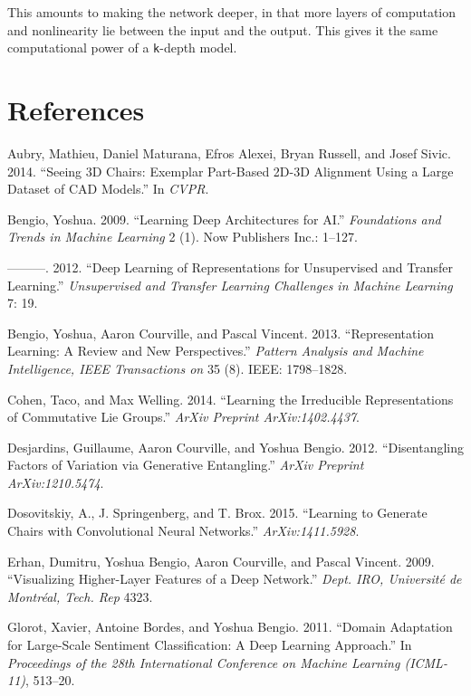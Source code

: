 \documentclass[12pt,twoside]{mitthesis}
\begin{document}
This amounts to making the network deeper, in that more layers of
computation and nonlinearity lie between the input and the output. This
gives it the same computational power of a \texttt{k}-depth model.

\chapter*{References}\label{references}

\hypertarget{refs}{}
\hypertarget{ref-aubry2014seeing}{}
Aubry, Mathieu, Daniel Maturana, Efros Alexei, Bryan Russell, and Josef
Sivic. 2014. ``Seeing 3D Chairs: Exemplar Part-Based 2D-3D Alignment
Using a Large Dataset of CAD Models.'' In \emph{CVPR}.

\hypertarget{ref-bengio2009learning}{}
Bengio, Yoshua. 2009. ``Learning Deep Architectures for AI.''
\emph{Foundations and Trends in Machine Learning} 2 (1). Now Publishers
Inc.: 1--127.

\hypertarget{ref-bengio2012deep}{}
---------. 2012. ``Deep Learning of Representations for Unsupervised and
Transfer Learning.'' \emph{Unsupervised and Transfer Learning Challenges
in Machine Learning} 7: 19.

\hypertarget{ref-bengio2013representation}{}
Bengio, Yoshua, Aaron Courville, and Pascal Vincent. 2013.
``Representation Learning: A Review and New Perspectives.''
\emph{Pattern Analysis and Machine Intelligence, IEEE Transactions on}
35 (8). IEEE: 1798--1828.

\hypertarget{ref-cohen2014learning}{}
Cohen, Taco, and Max Welling. 2014. ``Learning the Irreducible
Representations of Commutative Lie Groups.'' \emph{ArXiv Preprint
ArXiv:1402.4437}.

\hypertarget{ref-desjardins2012disentangling}{}
Desjardins, Guillaume, Aaron Courville, and Yoshua Bengio. 2012.
``Disentangling Factors of Variation via Generative Entangling.''
\emph{ArXiv Preprint ArXiv:1210.5474}.

\hypertarget{ref-dosovitskiy2015learning}{}
Dosovitskiy, A., J. Springenberg, and T. Brox. 2015. ``Learning to
Generate Chairs with Convolutional Neural Networks.''
\emph{ArXiv:1411.5928}.

\hypertarget{ref-erhan2009visualizing}{}
Erhan, Dumitru, Yoshua Bengio, Aaron Courville, and Pascal Vincent.
2009. ``Visualizing Higher-Layer Features of a Deep Network.''
\emph{Dept. IRO, Université de Montréal, Tech. Rep} 4323.

\hypertarget{ref-glorot2011domain}{}
Glorot, Xavier, Antoine Bordes, and Yoshua Bengio. 2011. ``Domain
Adaptation for Large-Scale Sentiment Classification: A Deep Learning
Approach.'' In \emph{Proceedings of the 28th International Conference on
Machine Learning (ICML-11)}, 513--20.
\end{document}
